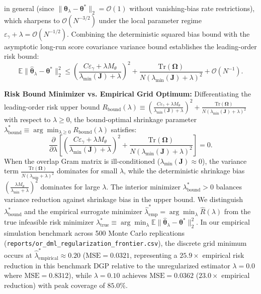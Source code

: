 \documentclass[twoside]{article}
\theoremstyle{definition}
\newcommand{\E}{\mathbb{E}}
\begin{document}
in general (since $\|\boldsymbol{\theta}_\lambda - \boldsymbol{\theta}^*\|_2 = \mathcal{O}(1)$ without vanishing-bias rate restrictions), which sharpens to $\mathcal{O}(N^{-3/2})$ under the local parameter regime $\varepsilon_\gamma + \lambda = \mathcal{O}(N^{-1/2})$.
Combining the deterministic squared bias bound with the asymptotic long-run score covariance variance bound establishes the leading-order risk bound:
\begin{equation}
    \E\|\hat{\boldsymbol{\theta}}_\lambda - \boldsymbol{\theta}^*\|_2^2 \le \left(\frac{C \varepsilon_\gamma + \lambda M_\theta}{\lambda_{\min}(\boldsymbol{J}) + \lambda}\right)^2 + \frac{\mathrm{Tr}(\boldsymbol{\Omega})}{N (\lambda_{\min}(\boldsymbol{J}) + \lambda)^2} + \mathcal{O}(N^{-1}).
\end{equation}

\textbf{Risk Bound Minimizer vs. Empirical Grid Optimum:}
Differentiating the leading-order risk upper bound $R_{\mathrm{bound}}(\lambda) \equiv \left(\frac{C \varepsilon_\gamma + \lambda M_\theta}{\lambda_{\min}(\boldsymbol{J}) + \lambda}\right)^2 + \frac{\mathrm{Tr}(\boldsymbol{\Omega})}{N (\lambda_{\min}(\boldsymbol{J}) + \lambda)^2}$ with respect to $\lambda \ge 0$, the bound-optimal shrinkage parameter $\lambda^*_{\mathrm{bound}} \equiv \arg\min_{\lambda \ge 0} R_{\mathrm{bound}}(\lambda)$ satisfies:
\begin{equation}
    \frac{\partial}{\partial \lambda} \left[ \left(\frac{C \varepsilon_\gamma + \lambda M_\theta}{\lambda_{\min}(\boldsymbol{J}) + \lambda}\right)^2 + \frac{\mathrm{Tr}(\boldsymbol{\Omega})}{N (\lambda_{\min}(\boldsymbol{J}) + \lambda)^2} \right] = 0.
\end{equation}
When the overlap Gram matrix is ill-conditioned ($\lambda_{\min}(\boldsymbol{J}) \approx 0$), the variance term $\frac{\mathrm{Tr}(\boldsymbol{\Omega})}{N (\lambda_{\min} + \lambda)^2}$ dominates for small $\lambda$, while the deterministic shrinkage bias $(\frac{\lambda M_\theta}{\lambda_{\min} + \lambda})^2$ dominates for large $\lambda$. The interior minimizer $\lambda^*_{\mathrm{bound}} > 0$ balances variance reduction against shrinkage bias in the upper bound. We distinguish $\lambda^*_{\mathrm{bound}}$ and the empirical surrogate minimizer $\hat{\lambda}^*_{\mathrm{emp}} = \arg\min_\lambda \hat{R}(\lambda)$ from the true infeasible risk minimizer $\lambda^*_{\mathrm{true}} \equiv \arg\min_\lambda \E\|\hat{\boldsymbol{\theta}}_\lambda - \boldsymbol{\theta}^*\|_2^2$.
In our empirical simulation benchmark across 500 Monte Carlo replications (\texttt{reports/or\_dml\_regularization\_frontier.csv}), the discrete grid minimum occurs at $\hat{\lambda}^*_{\mathrm{empirical}} \approx 0.20$ ($\text{MSE} = 0.0321$, representing a $25.9\times$ empirical risk reduction in this benchmark DGP relative to the unregularized estimator $\lambda = 0.0$ where $\text{MSE} = 0.8312$), while $\lambda = 0.10$ achieves $\text{MSE} = 0.0362$ ($23.0\times$ empirical reduction) with peak coverage of $85.0\%$.
\end{document}
